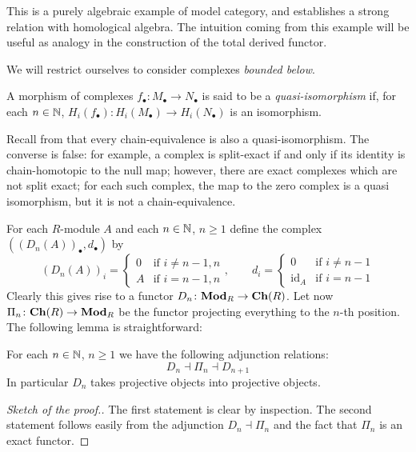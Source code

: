 \begin{refsection}
This is a purely algebraic example of model category, and establishes a strong relation with homological algebra. The intuition coming from this example will be useful as analogy in the construction of the total derived functor.

We will restrict ourselves to consider complexes \emph{bounded below}.

\begin{defin}
A morphism of complexes $f_\bullet \colon M_\bullet \to N_\bullet$ is said to be a \emph{quasi-isomorphism} if, for each $n \in \mathbb{N}$, $H_i(f_\bullet) \colon H_i(M_\bullet) \to H_i(N_\bullet)$ is an isomorphism.
\end{defin}

\begin{rmk}
Recall from \cite[Ch. I]{weibel} that every chain-equivalence is also a quasi-isomorphism. The converse is false: for example, a complex is split-exact if and only if its identity is chain-homotopic to the null map; however, there are exact complexes which are not split exact; for each such complex, the map to the zero complex is a quasi isomorphism, but it is not a chain-equivalence.
\end{rmk}

For each $R$-module $A$ and each $n \in \mathbb{N}$, $n \ge 1$ define the complex $((D_n(A))_\bullet,d_\bullet)$ by
\[
(D_n(A))_i = \begin{cases} 0 & \text{if } i \ne n - 1, n \\ A & \text{if } i = n-1,n \end{cases}, \qquad d_i = \begin{cases} 0 & \text{if } i \ne n-1 \\ \mathrm{id}_A & \text{if } i = n-1 \end{cases}
\]
Clearly this gives rise to a functor $D_n \colon \mathbf{Mod}_R \to \mathbf{Ch}(R)$. Let now $\Pi_n \colon \mathbf{Ch}(R) \to \mathbf{Mod}_R$ be the functor projecting everything to the $n$-th position. The following lemma is straightforward:

\begin{lemma} \label{lemma chain complexes}
For each $n \in \mathbb{N}$, $n \ge 1$ we have the following adjunction relations:
\[
D_n \dashv \Pi_n \dashv D_{n+1}
\]
In particular $D_n$ takes projective objects into projective objects.
\end{lemma}

\begin{proof}[Sketch of the proof.]
The first statement is clear by inspection. The second statement follows easily from the adjunction $D_n \dashv \Pi_n$ and the fact that $\Pi_n$ is an exact functor.
\end{proof}


\end{refsection}
